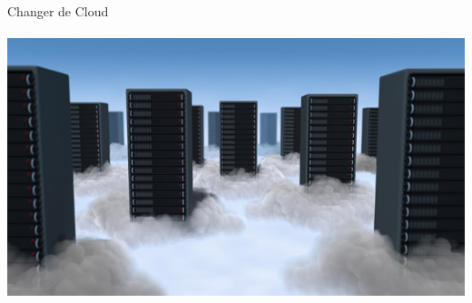 \documentclass{beamer}
\begin{document}
\begin{frame}
\begin{center}
\Huge{Changer de Cloud}
\\~\\
\includegraphics[scale=0.35] {./images/cloud_data_center.jpg}
\end{center}
\end{frame}
\end{document}
